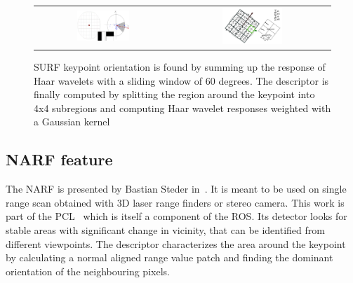 \begin{figure}[H]
\centering
 \begin{tabular}{cc}
 \includegraphics[width=0.4\textwidth]{figures/surf_orientation} &
 \includegraphics[width=0.4\textwidth]{figures/surf_descriptor}
\end{tabular}
\caption{SURF keypoint orientation is found by summing up the response of Haar wavelets with a sliding window of 60 degrees. The descriptor is finally computed by splitting the region around the keypoint into 4x4 subregions and computing Haar wavelet responses weighted with a Gaussian kernel}
\end{figure}

\subsection{NARF feature}

The \gls{NARF} is presented by Bastian Steder in~\cite{steder10irosws}. It is meant to be used on single range scan obtained with 3D laser range finders or stereo camera. This work is part of the \gls{PCL}~\cite{Rusu_ICRA2011_PCL} which is itself a component of the \gls{ROS}. Its detector looks for stable areas with significant change in vicinity, that can be identified from different viewpoints. The descriptor characterizes the area around the keypoint by calculating a normal aligned range value patch and finding the dominant orientation of the neighbouring pixels.

